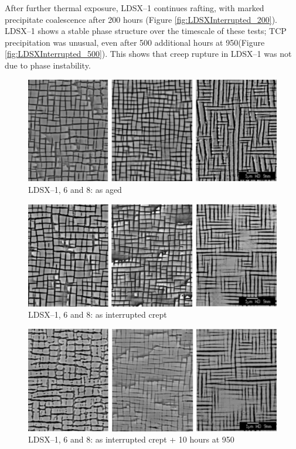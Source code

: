 After further thermal exposure, LDSX--1 continues rafting, with marked precipitate coalescence after 200 hours (Figure \ref{fig:LDSXInterrupted_200}).  LDSX--1 shows a stable phase structure over the timescale of these tests; TCP precipitation was unusual, even after 500 additional hours at 950\celsius (Figure \ref{fig:LDSXInterrupted_500}).  This shows that creep rupture in LDSX--1 was not due to phase instability.
%
\begin{figure}[hp]
\begin{center}
\includegraphics{LDSXAsAged}
\caption{LDSX--1, 6 and 8: as aged}\label{fig:LDSXAsAged}
\end{center}
\end{figure} 
%
\begin{figure}[hp]
\begin{center}
\includegraphics{LDSXInterrupted}
\caption{LDSX--1, 6 and 8: as interrupted crept }\label{fig:LDSXInterrupted}
\end{center}
\end{figure} 
%
\begin{figure}[hp]
\begin{center}
\includegraphics{LDSXInterrupted_10}
\caption{LDSX--1, 6 and 8: as interrupted crept + 10 hours at 950\celsius}\label{fig:LDSXInterrupted_10}
\end{center}
\end{figure} 
